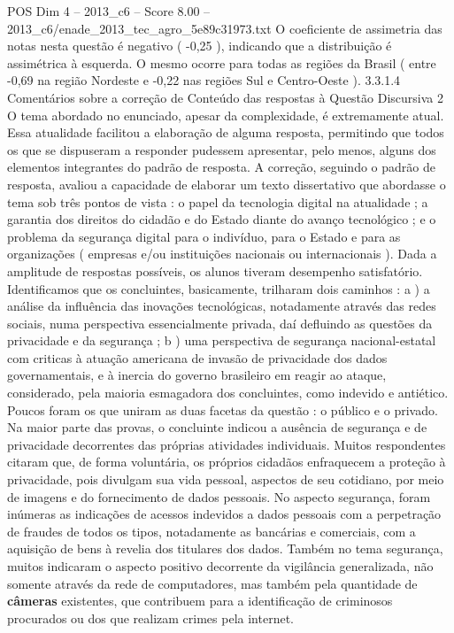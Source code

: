 \begin{textsample}{POS Dim 4 – 2013\_c6 – Score 8.00 – 2013\_c6/enade\_2013\_tec\_agro\_5e89c31973.txt}
O coeficiente de assimetria das notas nesta questão é negativo ( -0,25 ), indicando que a distribuição é assimétrica à esquerda.
O mesmo ocorre para todas as regiões da Brasil ( entre -0,69 na região Nordeste e -0,22 nas regiões Sul e Centro-Oeste ). 3.3.1.4 Comentários sobre a correção de Conteúdo das respostas à Questão Discursiva 2 O tema abordado no enunciado, apesar da complexidade, é extremamente atual.
Essa atualidade facilitou a elaboração de alguma resposta, permitindo que todos os que se dispuseram a responder pudessem apresentar, pelo menos, alguns dos elementos integrantes do padrão de resposta.
A correção, seguindo o padrão de resposta, avaliou a capacidade de elaborar um texto dissertativo que abordasse o tema sob três pontos de vista : o papel da tecnologia digital na atualidade ; a garantia dos direitos do cidadão e do Estado diante do avanço tecnológico ; e o problema da segurança digital para o indivíduo, para o Estado e para as organizações ( empresas e/ou instituições nacionais ou internacionais ).
Dada a amplitude de respostas possíveis, os alunos tiveram desempenho satisfatório.
Identificamos que os concluintes, basicamente, trilharam dois caminhos : a ) a análise da influência das inovações tecnológicas, notadamente através das redes sociais, numa perspectiva essencialmente privada, daí defluindo as questões da privacidade e da segurança ; b ) uma perspectiva de segurança nacional-estatal com criticas à atuação americana de invasão de privacidade dos dados governamentais, e à inercia do governo brasileiro em reagir ao ataque, considerado, pela maioria esmagadora dos concluintes, como indevido e antiético.
Poucos foram os que uniram as duas facetas da questão : o público e o privado.
Na maior parte das provas, o concluinte indicou a ausência de segurança e de privacidade decorrentes das próprias atividades individuais.
Muitos respondentes citaram que, de forma voluntária, os próprios cidadãos enfraquecem a proteção à privacidade, pois divulgam sua vida pessoal, aspectos de seu cotidiano, por meio de imagens e do fornecimento de dados pessoais.
No aspecto segurança, foram inúmeras as indicações de acessos indevidos a dados pessoais com a perpetração de fraudes de todos os tipos, notadamente as bancárias e comerciais, com a aquisição de bens à revelia dos titulares dos dados.
Também no tema segurança, muitos indicaram o aspecto positivo decorrente da vigilância generalizada, não somente através da rede de computadores, mas também pela quantidade de \textbf{câmeras} existentes, que contribuem para a identificação de criminosos procurados ou dos que realizam crimes pela internet.

\end{textsample}
